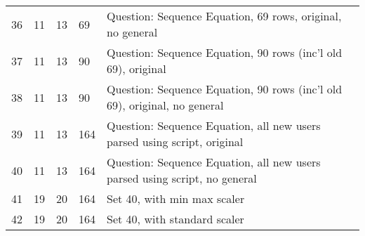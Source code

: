 \documentclass{report}
\begin{document}
\begin{longtable}[h!]{m{4.5em}m{2.5em}m{3em}m{3em}m{18em}}
36 & 11 & 13 & 69 & Question: Sequence Equation, 69 rows, original, no general \\
37 & 11 & 13 & 90 & Question: Sequence Equation, 90 rows (inc'l old 69), original \\
38 & 11 & 13 & 90 & Question: Sequence Equation, 90 rows (inc'l old 69), original, no general \\
39 & 11 & 13 & 164 & Question: Sequence Equation, all new users parsed using script, original \\
40 & 11 & 13 & 164 & Question: Sequence Equation, all new users parsed using script, no general \\
41 & 19 & 20 & 164 & Set 40, with min max scaler \\
42 & 19 & 20 & 164 & Set 40, with standard scaler \\
\hline
\end{longtable}

\setlength{\parskip}{0.5em}

\listoffigures

\listoftables
\end{document}
